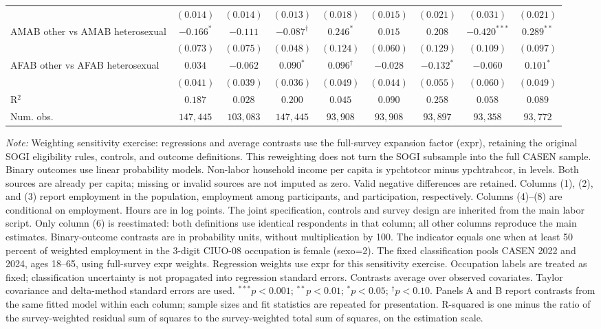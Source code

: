 \begin{table}[htpb!]
{\begin{tabular}{l c c c c c c c c}
 & $(0.014)$ & $(0.014)$ & $(0.013)$ & $(0.018)$ & $(0.015)$ & $(0.021)$ & $(0.031)$ & $(0.021)$ \\
AMAB other vs AMAB heterosexual & $-0.166^{*}$ & $-0.111$ & $-0.087^{\dagger}$ & $0.246^{*}$ & $0.015$ & $0.208$ & $-0.420^{***}$ & $0.289^{**}$ \\
 & $(0.073)$ & $(0.075)$ & $(0.048)$ & $(0.124)$ & $(0.060)$ & $(0.129)$ & $(0.109)$ & $(0.097)$ \\
AFAB other vs AFAB heterosexual & $0.034$ & $-0.062$ & $0.090^{*}$ & $0.096^{\dagger}$ & $-0.028$ & $-0.132^{*}$ & $-0.060$ & $0.101^{*}$ \\
 & $(0.041)$ & $(0.039)$ & $(0.036)$ & $(0.049)$ & $(0.044)$ & $(0.055)$ & $(0.060)$ & $(0.049)$ \\
\hline
R$^2$ & $0.187$ & $0.028$ & $0.200$ & $0.045$ & $0.090$ & $0.258$ & $0.058$ & $0.089$ \\
Num. obs. & $147,445$ & $103,083$ & $147,445$ & $93,908$ & $93,908$ & $93,897$ & $93,358$ & $93,772$ \\
\hline
\end{tabular}%
}
\par\vspace{1ex}
\begin{minipage}{\textwidth}\footnotesize\raggedright
\textit{Note:} Weighting sensitivity exercise: regressions and average contrasts use the full-survey expansion factor (expr), retaining the original SOGI eligibility rules, controls, and outcome definitions. This reweighting does not turn the SOGI subsample into the full CASEN sample. Binary outcomes use linear probability models. Non-labor household income per capita is ypchtotcor minus ypchtrabcor, in levels. Both sources are already per capita; missing or invalid sources are not imputed as zero. Valid negative differences are retained. Columns (1), (2), and (3) report employment in the population, employment among participants, and participation, respectively. Columns (4)--(8) are conditional on employment. Hours are in log points. The joint specification, controls and survey design are inherited from the main labor script. Only column (6) is reestimated: both definitions use identical respondents in that column; all other columns reproduce the main estimates. Binary-outcome contrasts are in probability units, without multiplication by 100. The indicator equals one when at least 50 percent of weighted employment in the 3-digit CIUO-08 occupation is female (sexo=2). The fixed classification pools CASEN 2022 and 2024, ages 18--65, using full-survey expr weights. Regression weights use expr for this sensitivity exercise. Occupation labels are treated as fixed; classification uncertainty is not propagated into regression standard errors. Contrasts average over observed covariates. Taylor covariance and delta-method standard errors are used. $^{***}p<0.001$; $^{**}p<0.01$; $^{*}p<0.05$; $^{\dagger}p<0.10$. Panels A and B report contrasts from the same fitted model within each column; sample sizes and fit statistics are repeated for presentation. R-squared is one minus the ratio of the survey-weighted residual sum of squares to the survey-weighted total sum of squares, on the estimation scale.

\end{minipage}
\end{table}

